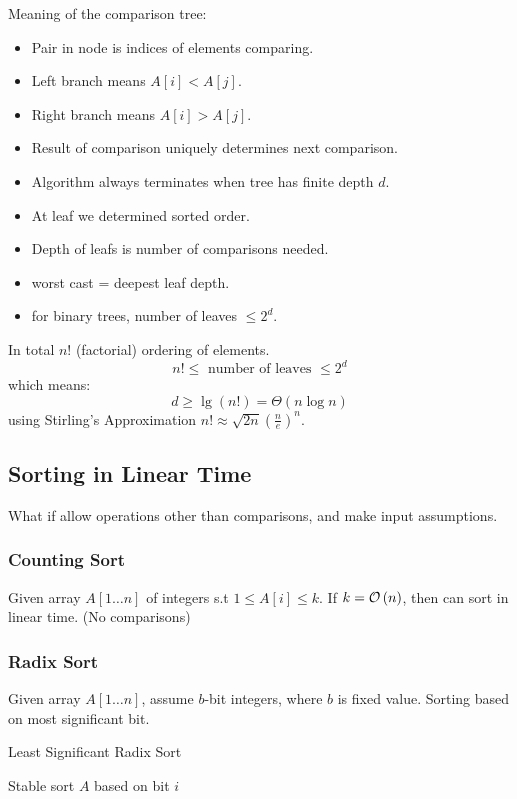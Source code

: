 Meaning of the comparison tree:
\begin{itemize}
    \item Pair in node is indices of elements comparing.
    \item Left branch means $A[i] < A[j]$.
    \item Right branch means $A[i] > A[j]$.
    \item Result of comparison uniquely determines next comparison.
    \item Algorithm always terminates when tree has finite depth $d$.
    \item At leaf we determined sorted order.
    \item Depth of leafs is number of comparisons needed.
    \item worst cast = deepest leaf depth.
    \item for binary trees, number of leaves $\leq 2^d$.
\end{itemize}
In total $n!$ (factorial) ordering of elements.
\[n! \leq \text{ number of leaves } \leq 2^d\]
which means:
\[d \geq \lg(n!) = \Theta(n \log n)\]
using Stirling's Approximation $\displaystyle n! \approx \sqrt{2n}\left(\frac{n}{e}\right)^n$.

\subsection{Sorting in Linear Time}
What if allow operations other than comparisons,
and make input assumptions.

\subsubsection{Counting Sort}
Given array $A[1 \ldots n]$ of integers s.t $1 \leq A[i] \leq k$.
If $k = \mathcal{O}\left(n\right)$, then can sort in linear time. (No comparisons)

\subsubsection{Radix Sort}
Given array $A[1 \ldots n]$, assume $b$-bit integers, where $b$ is fixed value.
Sorting based on most significant bit.

\begin{algorithm}[H]
    \caption{Least Significant Radix Sort}\label{algo:lrs}
    \begin{algorithmic}[1]
                \State Stable sort $A$ based on bit $i$
            \EndFor
        \EndProcedure
    \end{algorithmic}
\end{algorithm}

